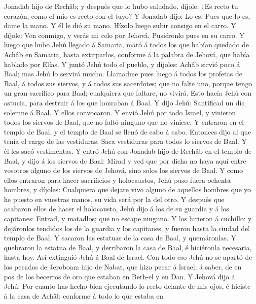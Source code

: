 Jonadab hijo de Rechâb; y después que lo hubo saludado, díjole: ¿Es
recto tu corazón, como el mío es recto con el tuyo? Y Jonadab dijo: Lo
es. Pues que lo es, dame la mano. Y él le dió su mano. Hízolo luego
subir consigo en el carro.  Y díjole: Ven conmigo, y verás
mi celo por Jehová. Pusiéronlo pues en su carro.  Y luego
que hubo Jehú llegado á Samaria, mató á todos los que habían quedado de
Achâb en Samaria, hasta extirparlos, conforme á la palabra de Jehová,
que había hablado por Elías.  Y juntó Jehú todo el pueblo,
y díjoles: Achâb sirvió poco á Baal; mas Jehú lo servirá mucho.
 Llamadme pues luego á todos los profetas de Baal, á todos
sus siervos, y á todos sus sacerdotes; que no falte uno, porque tengo un
gran sacrifico para Baal; cualquiera que faltare, no vivirá. Esto hacía
Jehú con astucia, para destruir á los que honraban á Baal. 
Y dijo Jehú: Santificad un día solemne á Baal. Y ellos convocaron.
 Y envió Jehú por todo Israel, y vinieron todos los siervos
de Baal, que no faltó ninguno que no viniese. Y entraron en el templo de
Baal, y el templo de Baal se llenó de cabo á cabo. 
Entonces dijo al que tenía el cargo de las vestiduras: Saca vestiduras
para todos lo siervos de Baal. Y él les sacó vestimentas. 
Y entró Jehú con Jonadab hijo de Rechâb en el templo de Baal, y dijo á
los siervos de Baal: Mirad y ved que por dicha no haya aquí entre
vosotros alguno de los siervos de Jehová, sino solos los siervos de
Baal.  Y como ellos entraron para hacer sacrificios y
holocaustos, Jehú puso fuera ochenta hombres, y díjoles: Cualquiera que
dejare vivo alguno de aquellos hombres que yo he puesto en vuestras
manos, su vida será por la del otro.  Y después que
acabaron ellos de hacer el holocausto, Jehú dijo á los de su guardia y á
los capitanes: Entrad, y matadlos; que no escape ninguno. Y los hirieron
á cuchillo: y dejáronlos tendidos los de la guardia y los capitanes, y
fueron hasta la ciudad del templo de Baal.  Y sacaron las
estatuas de la casa de Baal, y quemáronlas.  Y quebraron la
estatua de Baal, y derribaron la casa de Baal, é hiciéronla necesaria,
hasta hoy.  Así extinguió Jehú á Baal de Israel.
 Con todo eso Jehú no se apartó de los pecados de Jeroboam
hijo de Nabat, que hizo pecar á Israel; á saber, de en pos de los
becerros de oro que estaban en Beth-el y en Dan.  Y Jehová
dijo á Jehú: Por cuanto has hecho bien ejecutando lo recto delante de
mis ojos, é hiciste á la casa de Achâb conforme á todo lo que estaba en

